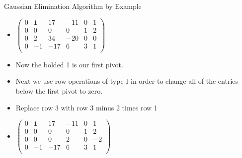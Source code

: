 \documentclass{beamer}
\begin{document}

\begin{frame}{Gaussian Elimination Algorithm by Example}

\begin{itemize}
\item $
\begin{pmatrix}
0 & \textbf{1} &  17    & -11   &  0  &  1  \\
0 &         0  &   0    &   0    &  1  &  2 \\
0 &         2  &  34    &  -20  &  0  &  0 \\
0 &        -1  &  -17   &  6    &  3  &  1 \\
\end{pmatrix}
$
\item Now the bolded 1 is our first pivot.
\item Next we use row operations of type I in order to change all of the
entries below the first pivot to zero.
\item Replace row 3 with row 3 minus 2 times row 1
\item $
\begin{pmatrix}
0 & \textbf{1} &  17   & -11  &  0  &  1  \\
0 &         0  &   0   &  0   &  1  &  2 \\
0 &         0  &   0   &  2   &  0  &  -2 \\
0 &        -1  &  -17   &  6   &  3  &  1 \\
\end{pmatrix}
$
\end{itemize}
\end{frame}

\end{document}
